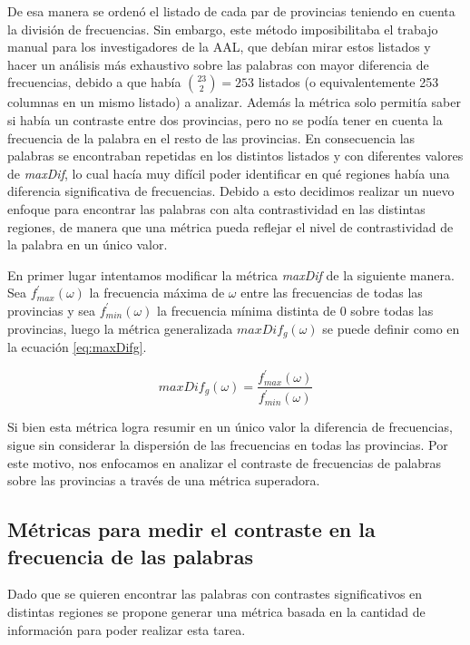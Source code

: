 De esa manera se ordenó el listado de cada par de provincias teniendo en cuenta la división de frecuencias. 
Sin embargo, este método imposibilitaba el trabajo manual para los investigadores de la AAL, que debían mirar estos listados y hacer un análisis más exhaustivo sobre las palabras con mayor diferencia de frecuencias, debido a que había $\binom{23}{2} = 253$
listados (o equivalentemente 253 columnas en un mismo listado) a analizar. Además la métrica solo permitía saber si había un contraste entre dos provincias, pero no se podía tener en cuenta la frecuencia de la palabra en el resto de las provincias. 
En consecuencia las palabras se encontraban repetidas en los distintos listados y con diferentes valores de \textit{maxDif}, lo cual hacía muy difícil poder identificar en qué regiones había una diferencia significativa de frecuencias.
Debido a esto decidimos realizar un nuevo enfoque para encontrar las palabras con alta contrastividad en las distintas regiones, de manera que una métrica pueda reflejar el nivel de contrastividad de la palabra en un único valor. 

En primer lugar intentamos modificar la métrica \textit{maxDif} de la siguiente manera. 
Sea $f_{max}^\prime(\omega)$ la frecuencia máxima de $\omega$ entre las frecuencias de todas las provincias y sea $f_{min}^\prime(\omega)$ la frecuencia mínima distinta de $0$ sobre todas las provincias, luego la métrica generalizada \textit{$maxDif_g(\omega)$} se puede definir como en la ecuación \ref{eq:maxDifg}.

\begin{equation}
 maxDif_g(\omega) = \frac{f_{max}^\prime(\omega)}{f_{min}^\prime(\omega)}
 \label{eq:maxDifg}  
\end{equation} 

Si bien esta métrica logra resumir en un único valor la diferencia de frecuencias, sigue sin considerar la dispersión de las frecuencias en todas las provincias.
Por este motivo, nos enfocamos en analizar el contraste de frecuencias de palabras sobre las provincias a través de una métrica superadora.

\subsection{Métricas para medir el contraste en la frecuencia de las palabras}
Dado que se quieren encontrar las palabras con contrastes significativos en distintas 
regiones se propone generar una métrica basada en la cantidad de información 
para poder realizar esta tarea.

